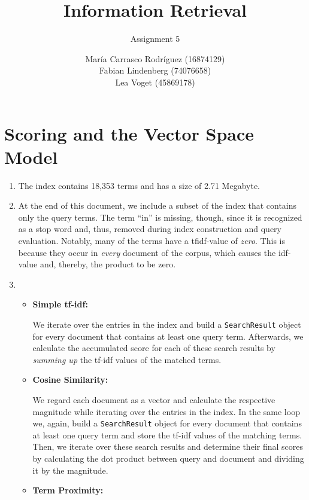 \documentclass[a4paper,11pt,oneside]{book}
\title{Information Retrieval }
\subtitle{Assignment 5}
\author{ María Carrasco Rodríguez (16874129) \\
		Fabian Lindenberg (74076658)\\
		Lea Voget (45869178)}
\begin{document}
\kostspieligmaketitle

\setcounter{chapter}{2}

\chapter{Scoring and the Vector Space Model}
 

\begin{enumerate}
		\renewcommand{\labelenumi}{\Roman{enumi})}
		\item The index contains 18,353 terms and has a size of 2.71 Megabyte.
		
		\item At the end of this document, we include a subset of the index that contains only the query terms. The term ``in'' is missing, though, since it is recognized as a stop word and, thus, removed during index construction and query evaluation. Notably, many of the terms have a tfidf-value of \emph{zero}. This is because they occur in \emph{every} document of the corpus, which causes the idf-value and, thereby, the product to be zero. 
	
		\item \begin{itemize}
						\item \textbf{Simple tf-idf:}
						
									We iterate over the entries in the index and build a \texttt{SearchResult} object for every document that contains at least one query term. Afterwards, we calculate the accumulated score for each of these search results by \emph{summing up} the tf-idf values of the matched terms.
									
						\item \textbf{Cosine Similarity:}
						
									We regard each document as a vector and calculate the respective magnitude while iterating over the entries in the index. In the same loop we, again, build a \texttt{SearchResult} object for every document that contains at least one query term and store the tf-idf values of the matching terms. Then, we iterate over these search results and determine their final scores by calculating the dot product between query and document and dividing it by the magnitude.
									
						\item \textbf{Term Proximity:}
						

\end{itemize}
\end{enumerate}
\end{document}
